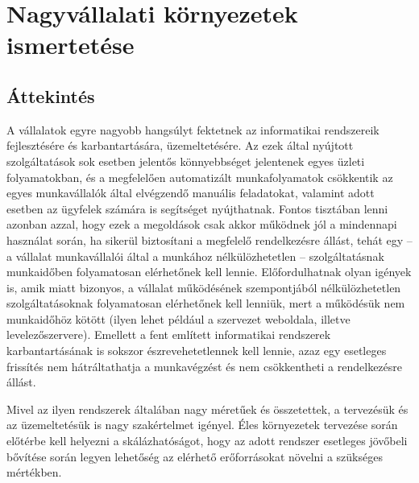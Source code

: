 

\chapter{Nagyvállalati környezetek ismertetése}

\section{Áttekintés}
A vállalatok egyre nagyobb hangsúlyt fektetnek az informatikai rendszereik fejlesztésére és karbantartására, üzemeltetésére. Az ezek által nyújtott szolgáltatások sok esetben jelentős könnyebbséget jelentenek egyes üzleti folyamatokban, és a megfelelően automatizált munkafolyamatok csökkentik az egyes munkavállalók által elvégzendő manuális feladatokat, valamint adott esetben az ügyfelek számára is segítséget nyújthatnak. Fontos tisztában lenni azonban azzal, hogy ezek a megoldások csak akkor működnek jól a mindennapi használat során, ha sikerül biztosítani a megfelelő rendelkezésre állást, tehát egy -- a vállalat munkavállalói által a munkához nélkülözhetetlen -- szolgáltatásnak munkaidőben folyamatosan elérhetőnek kell lennie. Előfordulhatnak olyan igények is, amik miatt bizonyos, a vállalat működésének szempontjából nélkülözhetetlen szolgáltatásoknak folyamatosan elérhetőnek kell lenniük, mert a működésük nem munkaidőhöz kötött (ilyen lehet például a szervezet weboldala, illetve levelezőszervere).  Emellett a fent említett informatikai rendszerek karbantartásának is sokszor észrevehetetlennek kell lennie, azaz egy esetleges frissítés nem hátráltathatja a munkavégzést és nem csökkentheti a rendelkezésre állást.

Mivel az ilyen rendszerek általában nagy méretűek és összetettek, a tervezésük és az üzemeltetésük is nagy szakértelmet igényel. Éles környezetek tervezése során előtérbe kell helyezni a skálázhatóságot, hogy az adott rendszer esetleges jövőbeli bővítése során legyen lehetőség az elérhető erőforrásokat növelni a szükséges mértékben.



